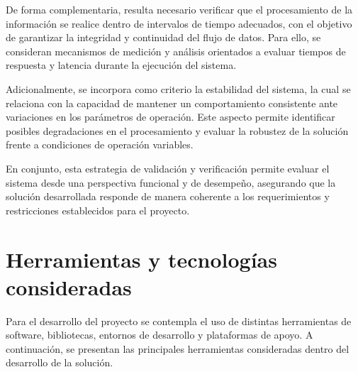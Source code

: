 De forma complementaria, resulta necesario verificar que el procesamiento de la información se realice dentro de intervalos de tiempo adecuados, con el objetivo de garantizar la integridad y continuidad del flujo de datos. Para ello, se consideran mecanismos de medición y análisis orientados a evaluar tiempos de respuesta y latencia durante la ejecución del sistema.

Adicionalmente, se incorpora como criterio la estabilidad del sistema, la cual se relaciona con la capacidad de mantener un comportamiento consistente ante variaciones en los parámetros de operación. Este aspecto permite identificar posibles degradaciones en el procesamiento y evaluar la robustez de la solución frente a condiciones de operación variables.

En conjunto, esta estrategia de validación y verificación permite evaluar el sistema desde una perspectiva funcional y de desempeño, asegurando que la solución desarrollada responde de manera coherente a los requerimientos y restricciones establecidos para el proyecto.


\section{Herramientas y tecnologías consideradas}

Para el desarrollo del proyecto se contempla el uso de distintas herramientas de software, bibliotecas, entornos de desarrollo y plataformas de apoyo. A continuación, se presentan las principales herramientas consideradas dentro del desarrollo de la solución.


